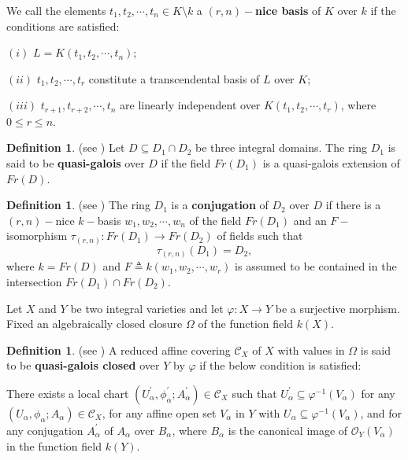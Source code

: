 \documentclass[12pt,twoside,reqno]{amsart}
\theoremstyle{definition}
\newtheorem{definition}[theorem]{Definition}
\numberwithin{equation}{section}
\begin{document}
We call the elements $t_{1},t_{2},\cdots ,t_{n}\in K\setminus k $ a \textbf{$(r,n)-$nice basis} of $K$ over $k$ if the conditions are satisfied:

$\left( i\right) $ $L=K(t_{1},t_{2},\cdots ,t_{n})$;

$\left( ii\right) $ $t_{1},t_{2},\cdots ,t_{r}$ constitute a transcendental
basis of $L$ over $K$;

$\left( iii\right) $ $t_{r+1},t_{r+2},\cdots ,t_{n}$ are linearly
independent over $K(t_{1},t_{2},\cdots ,t_{r})$, where $0\leq r\leq n$.

\begin{definition}
(see \cite{An2}) Let $D\subseteq D_{1}\cap D_{2}$ be three integral domains.
The ring $D_{1}$ is said to be \textbf{quasi-galois} over $D$ if the field $Fr\left( D_{1}\right) $ is a quasi-galois extension of $Fr\left( D\right) $.
\end{definition}

\begin{definition}
(see \cite{An2}) The ring $D_{1}$ is a \textbf{conjugation} of $D_{2}$ over $D$ if there is a $(r,n)-$nice $k-$basis $w_{1},w_{2},\cdots ,w_{n}$ of the
field $Fr(D_{1})$ and an $F-$isomorphism $\tau _{(r,n)}:Fr(D_{1})\rightarrow
Fr(D_{2})$ of fields such that
\begin{equation*}
\tau _{(r,n)}(D_{1})=D_{2},
\end{equation*}where $k=Fr(D)$ and $F\triangleq k(w_{1},w_{2},\cdots ,w_{r})$ is assumed to
be contained in the intersection $Fr(D_{1})\cap Fr(D_{2})$.
\end{definition}

Let $X$ and $Y$ be two integral varieties and let $\varphi :X\rightarrow Y$
be a surjective morphism. Fixed an algebraically closed closure $\Omega $ of
the function field $k\left( X\right) $.

\begin{definition}
(see \cite{An3}) A reduced affine covering $\mathcal{C}_{X}$ of $X$ with
values in $\Omega $ is said to be \textbf{quasi-galois closed} over $Y$ by $\varphi$ if the below condition is satisfied:

There exists a local chart $(U_{\alpha }^{\prime },\phi _{\alpha }^{\prime
};A_{\alpha }^{\prime })\in \mathcal{C}_{X}$ such that $U_{\alpha }^{\prime
}\subseteq \varphi ^{-1}(V_{\alpha })$ for any $(U_{\alpha },\phi _{\alpha
};A_{\alpha })\in \mathcal{C}_{X}$, for any affine open set $V_{\alpha }$ in
$Y$ with $U_{\alpha }\subseteq \varphi ^{-1}(V_{\alpha })$, and for any
conjugation $A_{\alpha }^{\prime }$ of $A_{\alpha }$ over $B_{\alpha }$,
where $B_{\alpha }$ is the canonical image of $\mathcal{O}_{Y}(V_{\alpha })$
in the function field $k(Y)$.
\end{definition}
\end{document}
